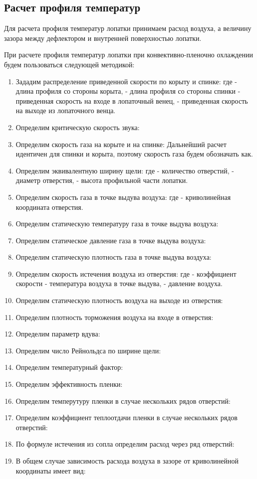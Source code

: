 \subsection{Расчет профиля температур}

Для расчета профиля температур лопатки принимаем расход воздуха, а величину зазора между дефлектором и
внутренней поверхностью лопатки.

При расчете профиля температур лопатки при конвективно-пленочно охлаждении будем пользоваться следующей методикой:
\begin{enumerate}
	\item Зададим распределение приведенной скорости по корыту и спинке:
		где - длина профиля со стороны корыта, - длина профиля со стороны спинки - приведенная скорость на входе в лопаточный венец,  - приведенная скорость на выходе из лопаточного венца.

	\item Определим критическую скорость звука:
	\item Определим скорость газа на корыте и на спинке:
	Дальнейший расчет идентичен для спинки и корыта, поэтому скорость газа будем обозначать как.
	\item Определим эквивалентную ширину щели:
		где - количество отверстий, - диаметр отверстия, - высота профильной части лопатки.
	\item Определим скорость газа в точке выдува воздуха:
		где - криволинейная координата отверстия.
	\item Определим статическую температуру газа в точке выдува воздуха:
	\item Определим статическое давление газа в точке выдува воздуха:
	\item Определим статическую плотность газа в точке выдува воздуха:
	\item Определим скорость истечения воздуха из отверстия:
	 	где - коэффициент скорости - температура воздуха в точке выдува, - давление воздуха.
	\item Определим статическую плотность воздуха на выходе из отверстия:
	\item Определим плотность торможения воздуха на входе в отверстия:
	\item Определим параметр вдува:
	\item Определим число Рейнольдса по ширине щели:
	\item Определим температурный фактор:
	\item Определим эффективность пленки:
	\item Определим темперутуру пленки в случае нескольких рядов отверстий:
	\item Определим коэффициент теплоотдачи пленки в случае нескольких рядов отверстий:
	\item По формуле истечения из сопла определим расход через ряд отверстий:
	\item В общем случае зависимость расхода воздуха в зазоре от криволинейной координаты имеет вид:


\end{enumerate}
